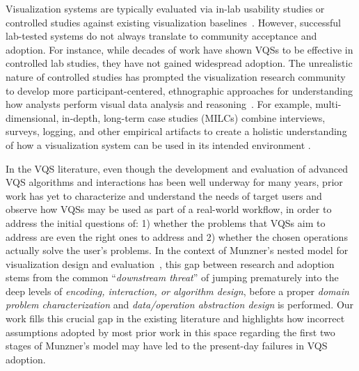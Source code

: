   \par {}
  \npar Visualization systems are typically evaluated via in-lab usability studies or controlled studies against existing visualization baselines~\cite{Plaisant2004,North2006,Yi2008}. However, successful lab-tested systems do not always translate to community acceptance and adoption. For instance, while decades of work have shown VQSs to be effective in controlled lab studies, they have not gained widespread adoption. The unrealistic nature of controlled studies has prompted the visualization research community to develop more participant-centered, ethnographic approaches for understanding how analysts perform visual data analysis and reasoning~\cite{Plaisant2004,lam2012empirical,shneiderman2006strategies,munzner2009nested,Sedlmair2012}. For example, multi-dimensional, in-depth, long-term case studies (MILCs) combine interviews, surveys, logging, and other empirical artifacts to create a holistic understanding of how a visualization system can be used in its intended environment \cite{shneiderman2006strategies}. 
  \par In the VQS literature, even though the development and evaluation of advanced VQS algorithms and interactions has been well underway for many years, prior work has yet to characterize and understand the needs of target users and observe how VQSs may be used as part of a real-world workflow, in order to address the initial questions of: 1) whether the problems that VQSs aim to address are even the right ones to address and 2) whether the chosen operations actually solve the user's problems. In the context of Munzner's nested model for visualization design and evaluation~\cite{munzner2009nested}, this gap between research and adoption stems from the common ``\textit{downstream threat}'' of jumping prematurely into the deep levels of \textit{encoding, interaction, or algorithm design}, before a proper \textit{domain problem characterization} and \textit{data/operation abstraction design} is performed. Our work fills this crucial gap in the existing literature and highlights how incorrect assumptions adopted by most prior work in this space regarding the first two stages of Munzner's model may have led to the present-day failures in VQS adoption.
